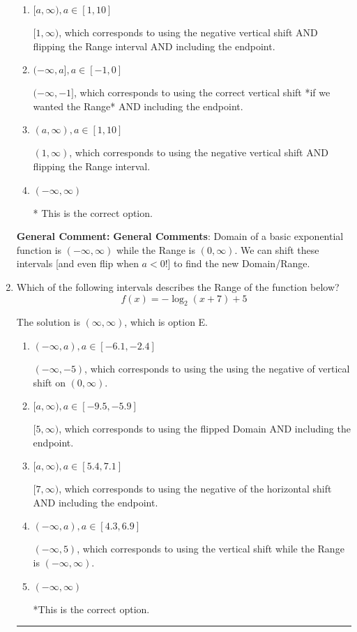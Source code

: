 \documentclass{extbook}[14pt]
\newcommand{\litem}[1]{\item #1

\rule{\textwidth}{0.4pt}}
\begin{document}
\begin{enumerate}
{\begin{enumerate}[label=\Alph*.]
$(-\infty, -1)$, which corresponds to using the correct vertical shift *if we wanted the Range*.
\item \( [a, \infty), a \in [1, 10] \)

$[1, \infty)$, which corresponds to using the negative vertical shift AND flipping the Range interval AND including the endpoint.
\item \( (-\infty, a], a \in [-1, 0] \)

$(-\infty, -1]$, which corresponds to using the correct vertical shift *if we wanted the Range* AND including the endpoint.
\item \( (a, \infty), a \in [1, 10] \)

$(1, \infty)$, which corresponds to using the negative vertical shift AND flipping the Range interval.
\item \( (-\infty, \infty) \)

* This is the correct option.
\end{enumerate}

\textbf{General Comment:} \textbf{General Comments}: Domain of a basic exponential function is $(-\infty, \infty)$ while the Range is $(0, \infty)$. We can shift these intervals [and even flip when $a<0$!] to find the new Domain/Range.
}
\litem{
Which of the following intervals describes the Range of the function below?
\[ f(x) = -\log_2{(x+7)}+5 \]

The solution is \( (\infty, \infty) \), which is option E.\begin{enumerate}[label=\Alph*.]
\item \( (-\infty, a), a \in [-6.1, -2.4] \)

$(-\infty, -5)$, which corresponds to using the using the negative of vertical shift on $(0, \infty)$.
\item \( [a, \infty), a \in [-9.5, -5.9] \)

$[5, \infty)$, which corresponds to using the flipped Domain AND including the endpoint.
\item \( [a, \infty), a \in [5.4, 7.1] \)

$[7, \infty)$, which corresponds to using the negative of the horizontal shift AND including the endpoint.
\item \( (-\infty, a), a \in [4.3, 6.9] \)

$(-\infty, 5)$, which corresponds to using the vertical shift while the Range is $(-\infty, \infty)$.
\item \( (-\infty, \infty) \)

*This is the correct option.
\end{enumerate}

}
\end{enumerate}
\end{document}
